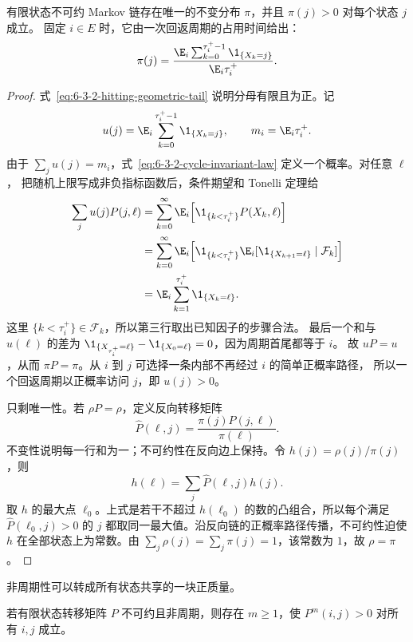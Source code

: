 \begin{theorem}[有限不可约链的不变分布]\label{theorem:6-3-2-1}
有限状态不可约 Markov 链存在唯一的不变分布 $\pi$，并且 $\pi(j)>0$ 对每个状态 $j$ 成立。
固定 $i\in E$ 时，它由一次回返周期的占用时间给出：
\begin{equation}\label{eq:6-3-2-cycle-invariant-law}
 \pi(j)=
 \frac{\E_i\sum_{k=0}^{\tau_i^+-1}\1_{\{X_k=j\}}}
      {\E_i\tau_i^+}.
\end{equation}
\end{theorem}

\begin{proof}
式~\eqref{eq:6-3-2-hitting-geometric-tail} 说明分母有限且为正。记
\[
 u(j)=\E_i\sum_{k=0}^{\tau_i^+-1}\1_{\{X_k=j\}},
 \qquad m_i=\E_i\tau_i^+.
\]
由于 $\sum_ju(j)=m_i$，式~\eqref{eq:6-3-2-cycle-invariant-law} 定义一个概率。对任意 $\ell$，
把随机上限写成非负指标函数后，条件期望和 Tonelli 定理给
\begin{align*}
 \sum_ju(j)P(j,\ell)
&=\sum_{k=0}^\infty
  \E_i\!\left[\1_{\{k<\tau_i^+\}}P(X_k,\ell)\right]\\
&=\sum_{k=0}^\infty
  \E_i\!\left[\1_{\{k<\tau_i^+\}}
   \E_i[\1_{\{X_{k+1}=\ell\}}\mid\mathcal F_k]\right]\\
 &=\E_i\sum_{k=1}^{\tau_i^+}\1_{\{X_k=\ell\}}.
\end{align*}
这里 $\{k<\tau_i^+\}\in\mathcal F_k$，所以第三行取出已知因子的步骤合法。
最后一个和与 $u(\ell)$ 的差为
$\1_{\{X_{\tau_i^+}=\ell\}}-\1_{\{X_0=\ell\}}=0$，因为周期首尾都等于 $i$。
故 $uP=u$，从而 $\pi P=\pi$。从 $i$ 到 $j$ 可选择一条内部不再经过 $i$ 的简单正概率路径，
所以一个回返周期以正概率访问 $j$，即 $u(j)>0$。

只剩唯一性。若 $\rho P=\rho$，定义反向转移矩阵
\[
 \widehat P(\ell,j)=\frac{\pi(j)P(j,\ell)}{\pi(\ell)}.
\]
不变性说明每一行和为一；不可约性在反向边上保持。令 $h(j)=\rho(j)/\pi(j)$，则
\[
 h(\ell)=\sum_j\widehat P(\ell,j)h(j).
\]
取 $h$ 的最大点 $\ell_0$。上式是若干不超过 $h(\ell_0)$ 的数的凸组合，所以每个满足
$\widehat P(\ell_0,j)>0$ 的 $j$ 都取同一最大值。沿反向链的正概率路径传播，不可约性迫使
$h$ 在全部状态上为常数。由 $\sum_j\rho(j)=\sum_j\pi(j)=1$，该常数为 $1$，故 $\rho=\pi$。
\end{proof}

非周期性可以转成所有状态共享的一块正质量。

\begin{lemma}[有限不可约非周期矩阵的共同正幂]\label{lemma:6-3-2-primitive}
若有限状态转移矩阵 $P$ 不可约且非周期，则存在 $m\geq1$，使
$P^m(i,j)>0$ 对所有 $i,j$ 成立。
\end{lemma}

